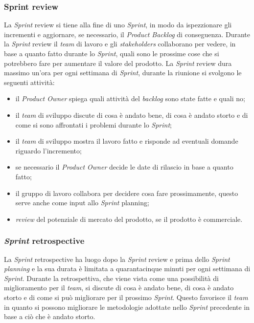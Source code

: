 \subsubsection{Sprint review}
La \textit{Sprint} review si tiene alla fine di uno \textit{Sprint}, in modo da ispezzionare gli incrementi e aggiornare, se necessario, il \textit{Product Backlog} di conseguenza. Durante la \textit{Sprint} review il \textit{team} di lavoro e gli \textit{stakeholders} collaborano per vedere, in base a quanto fatto durante lo \textit{Sprint}, quali sono le prossime cose che si potrebbero fare per aumentare il valore del prodotto. La \textit{Sprint} review dura massimo un'ora per ogni settimana di \textit{Sprint}, durante la riunione si svolgono le seguenti attività:
\begin{itemize}
    \item il \textit{Product Owner} spiega quali attività del \textit{backlog} sono state fatte e quali no;
    \item il \textit{team} di sviluppo discute di cosa è andato bene, di cosa è andato storto e di come si sono affrontati i problemi durante lo \textit{Sprint};
    \item il \textit{team} di sviluppo mostra il lavoro fatto e risponde ad eventuali domande riguardo l'incremento;
    \item se necessario il \textit{Product Owner} decide le date di rilascio in base a quanto fatto;
    \item il gruppo di lavoro collabora per decidere cosa fare prossimamente, questo serve anche come input allo \textit{Sprint} planning;
    \item \textit{review} del potenziale di mercato del prodotto, se il prodotto è commerciale.
\end{itemize}

\subsubsection{\textit{Sprint} retrospective}
La \textit{Sprint} retrospective ha luogo dopo la \textit{Sprint} review e prima dello \textit{Sprint} \textit{planning} e la sua durata è limitata a quarantacinque minuti per ogni settimana di \textit{Sprint}. Durante la retrospettiva, che viene vista come una possibilità di miglioramento per il \textit{team}, si discute di cosa è andato bene, di cosa è andato storto e di come si può migliorare per il prossimo \textit{Sprint}. Questo favorisce il \textit{team} in quanto si possono migliorare le metodologie adottate nello \textit{Sprint} precedente in base a ciò che è andato storto.